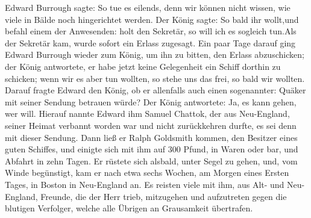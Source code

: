 Edward Burrough sagte: \glqq So tue es eilends, denn wir können nicht
wissen, wie viele in Bälde noch hingerichtet werden.\grqq{} Der König
sagte: \glqq So bald ihr wollt,\glqq und befahl einem der Anwesenden:
\grqq{} holt den Sekretär, so will ich es sogleich tun.\glqq Als der Sekretär
kam, wurde sofort ein Erlass zugesagt. Ein paar Tage darauf
ging Edward Burrough wieder zum König, um ihn zu bitten,
den Erlass abzuschicken; der König antwortete, er habe jetzt keine
Gelegenheit ein Schiff dorthin zu schicken; wenn wir es aber tun
wollten, so stehe uns das frei, so bald wir wollten. Darauf fragte
Edward den König, ob er allenfalls auch einen sogenannter:
\grqq{} Quäker\grqq{} mit seiner Sendung betrauen würde? Der König 
antwortete: \glqq Ja, es kann gehen, wer will.\grqq{} Hierauf nannte 
Edward ihm Samuel Chattok, der aus Neu-England, seiner Heimat
verbannt worden war und nicht zurückkehren durfte, es sei denn
mit dieser Sendung. Dann ließ er Ralph Goldsmith kommen,
den Besitzer eines guten Schiffes, und einigte sich mit ihm auf
300 Pfund, in Waren oder bar, und Abfahrt in zehn Tagen. Er
rüstete sich alsbald, unter Segel zu gehen, und, vom Winde 
begünstigt, kam er nach etwa sechs Wochen, am Morgen eines
Ersten Tages, in Boston in Neu-England an. Es reisten viele
mit ihm, aus Alt- und Neu-England, Freunde, die der Herr
trieb, mitzugehen und aufzutreten gegen die blutigen Verfolger,
welche alle Übrigen an Grausamkeit übertrafen.


